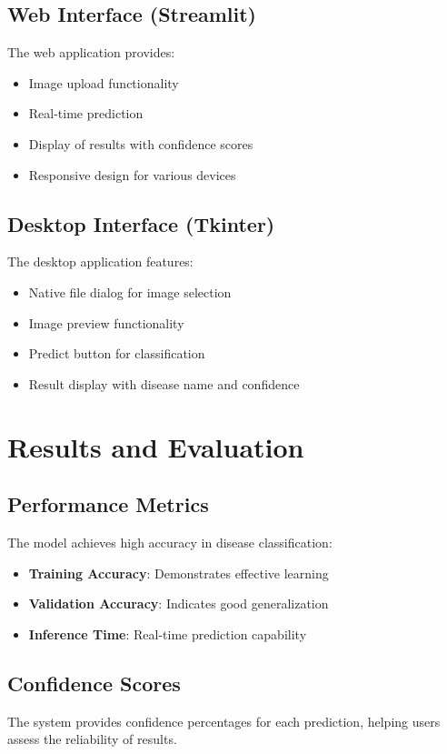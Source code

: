 \documentclass[12pt,a4paper]{article}
\begin{document}
\subsection{Web Interface (Streamlit)}
The web application provides:
\begin{itemize}
    \item Image upload functionality
    \item Real-time prediction
    \item Display of results with confidence scores
    \item Responsive design for various devices
\end{itemize}

\subsection{Desktop Interface (Tkinter)}
The desktop application features:
\begin{itemize}
    \item Native file dialog for image selection
    \item Image preview functionality
    \item Predict button for classification
    \item Result display with disease name and confidence
\end{itemize}

\section{Results and Evaluation}

\subsection{Performance Metrics}
The model achieves high accuracy in disease classification:
\begin{itemize}
    \item \textbf{Training Accuracy}: Demonstrates effective learning
    \item \textbf{Validation Accuracy}: Indicates good generalization
    \item \textbf{Inference Time}: Real-time prediction capability
\end{itemize}

\subsection{Confidence Scores}
The system provides confidence percentages for each prediction, helping users assess the reliability of results.
\end{document}

